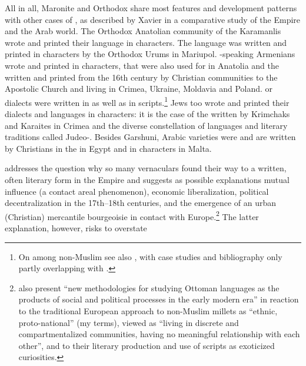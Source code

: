 \documentclass[output=paper,colorlinks,citecolor=brown,arabfont,syriacfont]{langscibook}
\begin{document}
All in all, Maronite and  Orthodox  share most features and development patterns with other cases of , as described by Xavier \citet{luffin2001} in a comparative study of the  Empire and the Arab world. The  Orthodox Anatolian community of the Karamanlis wrote and printed their  language in  characters. The   language was written and printed in  characters by the  Orthodox Urums in Mariupol. -speaking Armenians wrote and printed  in  characters, that were also used for  in Anatolia and the    written and printed from the 16th century by Christian communities  to the  Apostolic Church and living in Crimea, Ukraine, Moldavia and Poland.  or  dialects were written in  as well as in  scripts.\footnote{%
On  among non-Muslim  see also \citet[14--18]{murre-van_den_berg2020}, with case studies and bibliography only partly overlapping with \citet{luffin2001}.} Jews too wrote and printed their dialects and languages in  characters: it is the case of the  written by Krimchaks and Karaites in Crimea and the diverse constellation of languages and literary traditions called Judeo-. Besides Garshuni, Arabic varieties were and are written by Christians in the   in Egypt and in  characters in Malta.

\citet[5--15]{leezenberg2021} addresses the question why so many vernaculars found their way to a written, often literary form in the  Empire and suggests as possible explanations mutual influence (a contact areal phenomenon), economic liberalization, political decentralization in the 17th--18th centuries, and the emergence of an urban (Christian) mercantile bourgeoisie in contact with Europe.\footnote{%
\citet{gurbuzel_shapir2023} also present ``new methodologies for studying Ottoman languages as the products of social and political processes in the early modern era'' in reaction to the traditional European approach to non-Muslim millets as ``ethnic, proto-national''  (my terms), viewed as ``living in discrete and compartmentalized communities, having no meaningful relationship with each other'', and to their literary production and use of scripts as exoticized curiosities.} The latter explanation, however, risks to overstate
\end{document}
